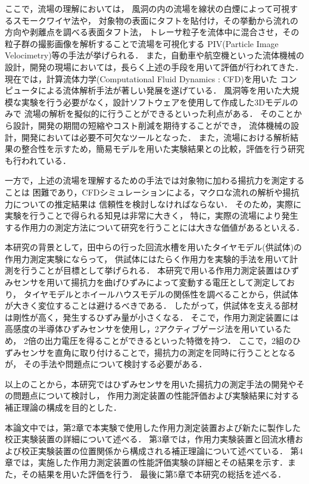 ここで，流場の理解においては，
風洞の内の流場を線状の白煙によって可視するスモークワイヤ法\cite{1994_smokewire}や，
対象物の表面にタフトを貼付け，その挙動から流れの方向や剥離点を調べる表面タフト法\cite{1994_taft}，
トレーサ粒子を流体中に混合させ，その粒子群の撮影画像を解析することで流場を可視化する
PIV(Particle Image Velocimetry)\cite{1999_PIV}等の手法が挙げられる．
また，自動車や航空機といった流体機械の設計，開発の現場においては，長らく上述の手段を用いて評価が行われてきた．\cite{1974_automobile}
現在では，計算流体力学(Computational Fluid Dynamics : CFD)を用いた
コンピュータによる流体解析手法が著しい発展を遂げている．
風洞等を用いた大規模な実験を行う必要がなく，設計ソフトウェアを使用して作成した3Dモデルのみで
流場の解析を擬似的に行うことができるといった利点がある．
そのことから設計，開発の期間の短縮やコスト削減を期待することができ，
流体機械の設計，開発\cite{2013_aircraft}\cite{1996_ship}においては必要不可欠なツールとなった．
また，流場における解析結果の整合性を示すため，簡易モデルを用いた実験結果との比較，評価を行う研究\cite{2007_CFD_comparison}も行われている．

一方で，上述の流場を理解するための手法では対象物に加わる揚抗力を測定することは
困難であり，CFDシミュレーションによる，マクロな流れの解析や揚抗力についての推定結果は
信頼性を検討しなければならない．\cite{2001_CFD_kobe}
そのため，実際に実験を行うことで得られる知見は非常に大きく，
特に，実際の流場により発生する作用力の測定方法について研究を行うことには大きな価値があるといえる．

本研究の背景として，田中ら\cite{2019_master}の行った回流水槽を用いたタイヤモデル(供試体)の作用力測定実験にならって，
供試体にはたらく作用力を実験的手法を用いて計測を行うことが目標として挙げられる．
本研究で用いる作用力測定装置はひずみセンサを用いて揚抗力を曲げひずみによって変動する電圧として測定しており，
タイヤモデルとホイールハウスモデルの関係性を調べることから，供試体が大きく変位することは避けるべきである．
したがって，供試体を支える部材は剛性が高く，発生するひずみ量が小さくなる．
そこで，作用力測定装置には高感度の半導体ひずみセンサを使用し，2アクティブゲージ法\cite{2006_strainsensor}を用いているため，
2倍の出力電圧を得ることができるといった特徴を持つ．
ここで，2組のひずみセンサを直角に取り付けることで，揚抗力の測定を同時に行うこととなるが，
その手法や問題点について検討する必要がある．

\newpage

以上のことから，本研究ではひずみセンサを用いた揚抗力の測定手法の開発やその問題点について検討し，
作用力測定装置の性能評価および実験結果に対する補正理論の構成を目的とした．

本論文中では，第2章で本実験で使用した作用力測定装置および新たに製作した校正実験装置の詳細について述べる．
第3章では，作用力実験装置と回流水槽および校正実験装置の位置関係から構成される補正理論について述べている．
第4章では，実施した作用力測定装置の性能評価実験の詳細とその結果を示す．また，その結果を用いた評価を行う．
最後に第5章で本研究の総括を述べる．
